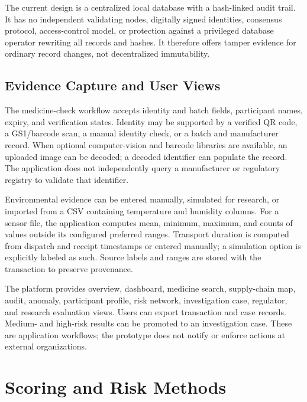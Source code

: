 \documentclass[conference]{IEEEtran}
\begin{document}
The current design is a centralized local database with a hash-linked audit trail. It has no independent validating nodes, digitally signed identities, consensus protocol, access-control model, or protection against a privileged database operator rewriting all records and hashes. It therefore offers tamper evidence for ordinary record changes, not decentralized immutability.

\subsection{Evidence Capture and User Views}
The medicine-check workflow accepts identity and batch fields, participant names, expiry, and verification states. Identity may be supported by a verified QR code, a GS1/barcode scan, a manual identity check, or a batch and manufacturer record. When optional computer-vision and barcode libraries are available, an uploaded image can be decoded; a decoded identifier can populate the record. The application does not independently query a manufacturer or regulatory registry to validate that identifier.

Environmental evidence can be entered manually, simulated for research, or imported from a CSV containing temperature and humidity columns. For a sensor file, the application computes mean, minimum, maximum, and counts of values outside its configured preferred ranges. Transport duration is computed from dispatch and receipt timestamps or entered manually; a simulation option is explicitly labeled as such. Source labels and ranges are stored with the transaction to preserve provenance.

The platform provides overview, dashboard, medicine search, supply-chain map, audit, anomaly, participant profile, risk network, investigation case, regulator, and research evaluation views. Users can export transaction and case records. Medium- and high-risk results can be promoted to an investigation case. These are application workflows; the prototype does not notify or enforce actions at external organizations.

\section{Scoring and Risk Methods}
\end{document}
